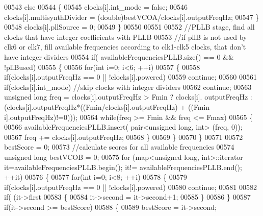 \begin{DoxyCode}
{00543         \textcolor{keywordflow}{else}
00544         \{
00545             clocks[i].int_mode = \textcolor{keyword}{false};
00546             clocks[i].multisynthDivider = (double)bestVCOA/clocks[i].outputFreqHz;
00547         \}
00548         clocks[i].pllSource = 0;
00549     \}
00550 
00551 
00552     \textcolor{comment}{//PLLB stage, find  all clocks that have integer coefficients with PLLB}
00553     \textcolor{comment}{//if pllB is not used by clk6 or clk7, fill available frequencies according to clk1-clk5 clocks, that
       don't have integer dividers}
00554     \textcolor{keywordflow}{if}( availableFrequenciesPLLB.size() == 0 && !pllBused)
00555     \{
00556         \textcolor{keywordflow}{for}(\textcolor{keywordtype}{int} i=0; i<6; ++i)
00557         \{
00558             \textcolor{keywordflow}{if}(clocks[i].outputFreqHz == 0 || !clocks[i].powered)
00559                 \textcolor{keywordflow}{continue};
00560 
00561             \textcolor{keywordflow}{if}(clocks[i].int\_mode) \textcolor{comment}{//skip clocks with integer dividers}
00562                 \textcolor{keywordflow}{continue};
00563             \textcolor{keywordtype}{unsigned} \textcolor{keywordtype}{long} freq = clocks[i].outputFreqHz > Fmin ? clocks[i].
      outputFreqHz : (clocks[i].outputFreqHz*((Fmin/clocks[i].outputFreqHz) + ((Fmin%
      i].outputFreqHz)!=0)));
00564             \textcolor{keywordflow}{while}(freq >= Fmin && freq <= Fmax)
00565             \{
00566                 availableFrequenciesPLLB.insert( pair<unsigned long, int> (freq, 0));
00567                 freq += clocks[i].outputFreqHz;
00568             \}
00569         \}
00570     \}
00571 
00572     bestScore = 0;
00573     \textcolor{comment}{//calculate scores for all available frequencies}
00574     \textcolor{keywordtype}{unsigned} \textcolor{keywordtype}{long} bestVCOB = 0;
00575     \textcolor{keywordflow}{for} (map<unsigned long, int>::iterator it=availableFrequenciesPLLB.begin(); it!=
      availableFrequenciesPLLB.end(); ++it)
00576     \{
00577         \textcolor{keywordflow}{for}(\textcolor{keywordtype}{int} i=0; i<8; ++i)
00578         \{
00579             \textcolor{keywordflow}{if}(clocks[i].outputFreqHz == 0 || !clocks[i].powered)
00580                 \textcolor{keywordflow}{continue};
00581 
00582             \textcolor{keywordflow}{if}( (it->first %
00583             \{
00584                 it->second = it->second+1;
00585             \}
00586         \}
00587         \textcolor{keywordflow}{if}(it->second >= bestScore)
00588         \{
00589             bestScore = it->second;
}
\end{DoxyCode}
